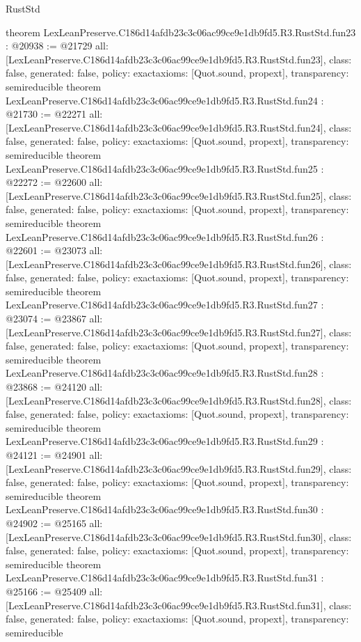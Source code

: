 \begin{lexlean}{RustStd}
\begin{coremodule}
{}
theorem LexLeanPreserve.C186d14afdb23c3c06ac99ce9e1db9fd5.R3.RustStd.fun23 : @20938 := @21729 {
  all: [LexLeanPreserve.C186d14afdb23c3c06ac99ce9e1db9fd5.R3.RustStd.fun23],
  class: false,
  generated: false,
  policy: exact{axioms: [Quot.sound, propext]},
  transparency: semireducible
}
theorem LexLeanPreserve.C186d14afdb23c3c06ac99ce9e1db9fd5.R3.RustStd.fun24 : @21730 := @22271 {
  all: [LexLeanPreserve.C186d14afdb23c3c06ac99ce9e1db9fd5.R3.RustStd.fun24],
  class: false,
  generated: false,
  policy: exact{axioms: [Quot.sound, propext]},
  transparency: semireducible
}
theorem LexLeanPreserve.C186d14afdb23c3c06ac99ce9e1db9fd5.R3.RustStd.fun25 : @22272 := @22600 {
  all: [LexLeanPreserve.C186d14afdb23c3c06ac99ce9e1db9fd5.R3.RustStd.fun25],
  class: false,
  generated: false,
  policy: exact{axioms: [Quot.sound, propext]},
  transparency: semireducible
}
theorem LexLeanPreserve.C186d14afdb23c3c06ac99ce9e1db9fd5.R3.RustStd.fun26 : @22601 := @23073 {
  all: [LexLeanPreserve.C186d14afdb23c3c06ac99ce9e1db9fd5.R3.RustStd.fun26],
  class: false,
  generated: false,
  policy: exact{axioms: [Quot.sound, propext]},
  transparency: semireducible
}
theorem LexLeanPreserve.C186d14afdb23c3c06ac99ce9e1db9fd5.R3.RustStd.fun27 : @23074 := @23867 {
  all: [LexLeanPreserve.C186d14afdb23c3c06ac99ce9e1db9fd5.R3.RustStd.fun27],
  class: false,
  generated: false,
  policy: exact{axioms: [Quot.sound, propext]},
  transparency: semireducible
}
theorem LexLeanPreserve.C186d14afdb23c3c06ac99ce9e1db9fd5.R3.RustStd.fun28 : @23868 := @24120 {
  all: [LexLeanPreserve.C186d14afdb23c3c06ac99ce9e1db9fd5.R3.RustStd.fun28],
  class: false,
  generated: false,
  policy: exact{axioms: [Quot.sound, propext]},
  transparency: semireducible
}
theorem LexLeanPreserve.C186d14afdb23c3c06ac99ce9e1db9fd5.R3.RustStd.fun29 : @24121 := @24901 {
  all: [LexLeanPreserve.C186d14afdb23c3c06ac99ce9e1db9fd5.R3.RustStd.fun29],
  class: false,
  generated: false,
  policy: exact{axioms: [Quot.sound, propext]},
  transparency: semireducible
}
theorem LexLeanPreserve.C186d14afdb23c3c06ac99ce9e1db9fd5.R3.RustStd.fun30 : @24902 := @25165 {
  all: [LexLeanPreserve.C186d14afdb23c3c06ac99ce9e1db9fd5.R3.RustStd.fun30],
  class: false,
  generated: false,
  policy: exact{axioms: [Quot.sound, propext]},
  transparency: semireducible
}
theorem LexLeanPreserve.C186d14afdb23c3c06ac99ce9e1db9fd5.R3.RustStd.fun31 : @25166 := @25409 {
  all: [LexLeanPreserve.C186d14afdb23c3c06ac99ce9e1db9fd5.R3.RustStd.fun31],
  class: false,
  generated: false,
  policy: exact{axioms: [Quot.sound, propext]},
  transparency: semireducible
}
\end{coremodule}
\end{lexlean}
